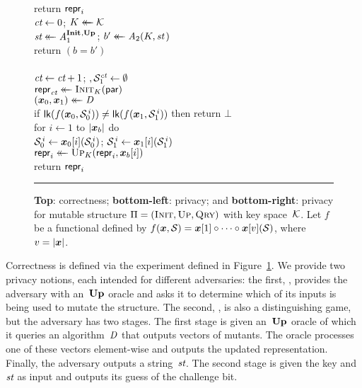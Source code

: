 \begin{figure}[t]
{      return $\mathsf{repr}_i$
  }
  {
    \\[2pt]
      $\textit{ct} \gets 0$;
      $K \mathrel{\leftarrow\mkern-14mu\leftarrow} \mathcal{K}$\\
      $\textit{st} \mathrel{\leftarrow\mkern-14mu\leftarrow} \mathit{A}_1^{\mathbf{Init}\hspace{0.5pt},\mathbf{Up}\hspace{0.5pt}}$;
      $b' \mathrel{\leftarrow\mkern-14mu\leftarrow} \mathit{A}_2(K, \textit{st}\,)$\\
      return $(b = b')$
    \\[6pt]
    \oraclev{$\INITO(\param)$}\\[2pt]
      $\textit{ct}\gets\textit{ct}+1$; $, \mathcal{S}^{\textit{ct}}_1 \gets \emptyset$\\
      $\mathsf{repr}_{\textit{ct}} \mathrel{\leftarrow\mkern-14mu\leftarrow} \textsc{Init}_K(\mathsf{par})$
    \\[6pt]
      $(\xx_0, \xx_1) \getsr \dist$\\[2pt]
      if $\lk(f(\xx_0,\col^{\,i}_0)) \ne \lk(f(\xx_1, \col^{\,i}_1))$ then return $\bot$\\
      for $i \gets 1$ to $|\xx_b|$ do\\
      \tab $\col^{\,i}_0 \gets \xx_0[i](\col^{\,i}_0)$;
           $\col^{\,i}_1 \gets \xx_1[i](\col^{\,i}_1)$\\
      \tab $\pub_i \getsr \Up_\key(\pub_i, \xx_b[i])$\\
      return $\mathsf{repr}_i$
  }
  \caption{\textbf{Top}: \errep correctness; \textbf{bottom-left}: \indrep
  privacy; and \textbf{bottom-right}: \indrepr privacy for mutable structure
  $\mathrm{\Pi} = (\textsc{Init}, \textsc{Up}, \textsc{Qry})$ with key space~$\mathcal{K}$. Let $f$ be a functional
  defined by $f(\xx, \col) = \xx[1] \circ \cdots \circ \xx[v] (\col)$, where
  $v=|\xx|$.}
  \vspace{6pt}\hrule
  \label{fig:security}
\end{figure}

Correctness is defined via the \errep experiment defined in
Figure~\ref{fig:security}.
%
We provide two privacy notions, each intended for different adversaries: the
first, \indrep, provides the adversary with an~$\mathbf{Up}\hspace{0.5pt}$ oracle and asks it to
determine which of its inputs is being used to mutate the structure.
%
The second, \indrepr, is also a distinguishing game, but the adversary has two
stages. The first stage is given an~$\mathbf{Up}\hspace{0.5pt}$ oracle of which it queries an
algorithm~$\mathit{D}$ that outputs vectors of mutants. The oracle processes one of
these vectors element-wise and outputs the updated representation. Finally, the
adversary outputs a string~$\textit{st}$. The second stage is given the key and~$\textit{st}$ as
input and outputs its guess of the challenge bit.